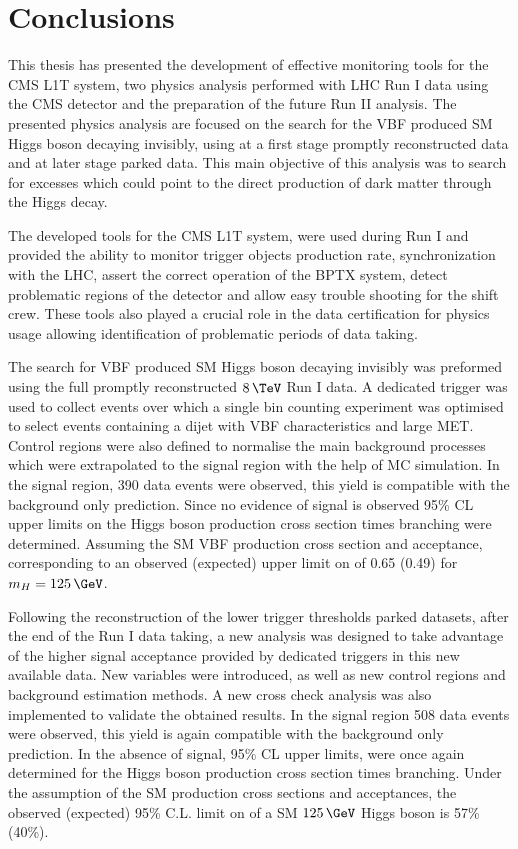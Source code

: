 \chapter{Conclusions}
\label{CHAPTER:Conclusions}


This thesis has presented the development of effective monitoring tools for the \gls{CMS} \gls{L1T} system, two physics analysis performed with \gls{LHC} Run I data using the \gls{CMS} detector and the preparation of the future Run II analysis. The presented physics analysis are focused on the search for the \gls{VBF} produced \gls{SM} Higgs boson decaying invisibly, using at a first stage promptly reconstructed data and at later stage parked data. This main objective of this analysis was to search for excesses which could point to the direct production of dark matter through the Higgs decay.

The developed tools for the \gls{CMS} \gls{L1T} system, were used during Run I and provided the ability to monitor trigger objects production rate, synchronization with the \gls{LHC}, assert the correct operation of the \gls{BPTX} system, detect problematic regions of the detector and allow easy trouble shooting for the shift crew. These tools also played a crucial role in the data certification for physics usage allowing identification of problematic periods of data taking.

The search for \gls{VBF} produced \gls{SM} Higgs boson decaying invisibly was preformed using the full promptly reconstructed $8\,\TeV$ Run I data. A dedicated trigger was used to collect events over which a single bin counting experiment was optimised to select events containing a dijet with \gls{VBF} characteristics and large \gls{MET}. Control regions were also defined to normalise the main background processes which were extrapolated to the signal region with the help of \gls{MC} simulation. In the signal region, 390 data events were observed, this yield is compatible with the background only prediction. Since no evidence of signal is observed 95\% \gls{CL} upper limits on the Higgs boson production cross section times branching were determined. Assuming the \gls{SM} \gls{VBF} production cross section and acceptance, corresponding to an observed (expected) upper limit on \BRinv of 0.65 (0.49) for $m_H=125\,\GeV$.

Following the reconstruction of the lower trigger thresholds parked datasets, after the end of the Run I data taking, a new analysis was designed to take advantage of the higher signal acceptance provided by dedicated triggers in this new available data. New variables were introduced, as well as new control regions and background estimation methods. A new cross check analysis was also implemented to validate the obtained results. In the signal region 508 data events were observed, this yield is again compatible with the background only prediction. In the absence of signal, 95\% \gls{CL} upper limits, were once again determined for the Higgs boson production cross section times branching. Under the assumption of the \gls{SM} production cross sections and acceptances, the observed (expected) 95\% C.L. limit on \BRinv of a \gls{SM} $125\,\GeV$ Higgs boson is 57\% (40\%).

